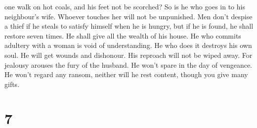 one walk on hot coals, and his feet not be scorched?  So is
he who goes in to his neighbour's wife. Whoever touches her will not be
unpunished.  Men don't despise a thief if he steals to
satisfy himself when he is hungry,  but if he is found, he
shall restore seven times. He shall give all the wealth of his house.
 He who commits adultery with a woman is void of
understanding. He who does it destroys his own soul.  He
will get wounds and dishonour. His reproach will not be wiped away.
 For jealousy arouses the fury of the husband. He won't
spare in the day of vengeance.  He won't regard any ransom,
neither will he rest content, though you give many gifts.

\hypertarget{section-6}{%
\section{7}\label{section-6}}

